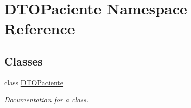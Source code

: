 \hypertarget{namespace_d_t_o_paciente}{}\section{D\+T\+O\+Paciente Namespace Reference}
\label{namespace_d_t_o_paciente}
\subsection*{Classes}
\begin{DoxyCompactItemize}
\item 
class \mbox{\hyperlink{class_d_t_o_paciente_1_1_d_t_o_paciente}{D\+T\+O\+Paciente}}
\begin{DoxyCompactList}\small\item\em Documentation for a class. \end{DoxyCompactList}\end{DoxyCompactItemize}

